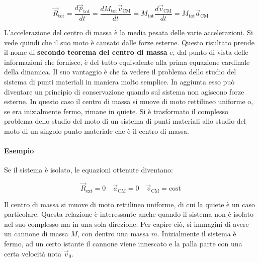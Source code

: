 \[
	\boxed{\vec{R}_\text{tot}=\frac{d\vec{p}_\text{tot}}{dt}=\frac{dM_\text{tot}\vec{v}_\text{CM}}{dt}=M_\text{tot}\frac{d\vec{v}_\text{CM}}{dt}=M_\text{tot}\vec{a}_\text{CM}}
\]

L'accelerazione del centro di massa è la media pesata delle varie accelerazioni. Si vede quindi che il suo moto è causato dalle forze esterne.  Questo risultato prende il nome di \textbf{secondo teorema del centro di massa} e, dal punto di vista delle informazioni che fornisce, è del tutto equivalente alla prima equazione cardinale della dinamica. Il suo vantaggio è che fa vedere il problema dello studio del sistema di punti materiali in maniera molto semplice.
In aggiunta esso può diventare un principio di conservazione quando sul sistema non agiscono forze esterne. In questo caso il centro di massa si muove di moto rettilineo uniforme o, se era inizialmente fermo, rimane in quiete.
Si è trasformato il complesso problema dello studio del moto di un sistema di punti materiali allo studio del moto di un singolo punto materiale che è il centro di massa.

\paragraph{Esempio} Se il sistema è isolato, le equazioni ottenute diventano:

\[
	\vec{R}_\text{ext}=0 \quad \vec{a}_\text{CM}=0 \quad \vec{v}_\text{CM}=\text{cost}
\]

Il centro di massa si muove di moto rettilineo uniforme, di cui la quiete è un caso particolare. Questa relazione è interessante anche quando il sistema non è isolato nel suo complesso ma in una sola direzione. Per capire ciò, si immagini di avere un cannone di massa $M$, con dentro una massa $m$. Inizialmente il sistema è fermo, ad un certo istante il cannone viene innescato e la palla parte con una certa velocità nota $\vec{v}_0$.

